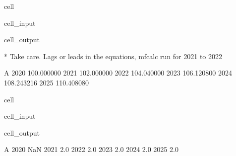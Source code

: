 \documentclass[letterpaper,10pt,english]{jupyterBook}
\begin{document}
\begin{sphinxuseclass}{cell}\begin{sphinxVerbatimInput}

\begin{sphinxuseclass}{cell_input}
\begin{sphinxVerbatim}[commandchars=\\\{\}]
  
\end{sphinxVerbatim}

\end{sphinxuseclass}\end{sphinxVerbatimInput}
\begin{sphinxVerbatimOutput}

\begin{sphinxuseclass}{cell_output}
\begin{sphinxVerbatim}[commandchars=\\\{\}]
* Take care. Lags or leads in the equations, mfcalc run for 2021 to 2022
\end{sphinxVerbatim}

\begin{sphinxVerbatim}[commandchars=\\\{\}]
               A
2020  100.000000
2021  102.000000
2022  104.040000
2023  106.120800
2024  108.243216
2025  110.408080
\end{sphinxVerbatim}

\end{sphinxuseclass}\end{sphinxVerbatimOutput}

\end{sphinxuseclass}
\begin{sphinxuseclass}{cell}\begin{sphinxVerbatimInput}

\begin{sphinxuseclass}{cell_input}
\begin{sphinxVerbatim}[commandchars=\\\{\}]
 
\end{sphinxVerbatim}

\end{sphinxuseclass}\end{sphinxVerbatimInput}
\begin{sphinxVerbatimOutput}

\begin{sphinxuseclass}{cell_output}
\begin{sphinxVerbatim}[commandchars=\\\{\}]
        A
2020  NaN
2021  2.0
2022  2.0
2023  2.0
2024  2.0
2025  2.0
\end{sphinxVerbatim}

\end{sphinxuseclass}\end{sphinxVerbatimOutput}

\end{sphinxuseclass}
\end{document}
